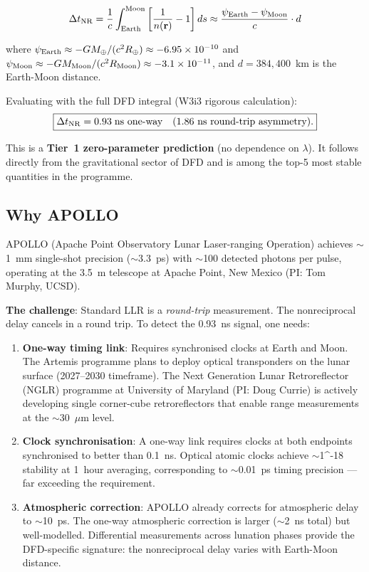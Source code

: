 \documentclass[11pt]{article}
\newcommand{\ee}[1]{\times 10^{#1}}
\begin{document}
\begin{equation}
\Delta t_{\rm NR} = \frac{1}{c}\int_{\rm Earth}^{\rm Moon}
\left[\frac{1}{n(\mathbf{r})} - 1\right] ds
\approx \frac{\psi_{\rm Earth} - \psi_{\rm Moon}}{c} \cdot d
\end{equation}

where $\psi_{\rm Earth} \approx -GM_\oplus/(c^2 R_\oplus) \approx
-6.95\ee{-10}$ and $\psi_{\rm Moon} \approx -GM_{\rm Moon}/(c^2
R_{\rm Moon}) \approx -3.1\ee{-11}$, and $d = 384{,}400$~km is
the Earth-Moon distance.

Evaluating with the full DFD integral (W3i3 rigorous calculation):
\begin{equation}
\boxed{\Delta t_{\rm NR} = 0.93 \;\text{ns one-way}
\quad \text{(1.86~ns round-trip asymmetry)}.}
\end{equation}

This is a \textbf{Tier~1 zero-parameter prediction} (no dependence
on $\lambda$). It follows directly from the gravitational sector of
DFD and is among the top-5 most stable quantities in the programme.

\subsection*{Why APOLLO}

APOLLO (Apache Point Observatory Lunar Laser-ranging Operation)
achieves $\sim$1~mm single-shot precision ($\sim$3.3~ps) with
$\sim$100 detected photons per pulse, operating at the 3.5~m
telescope at Apache Point, New Mexico (PI: Tom Murphy, UCSD).

\textbf{The challenge}: Standard LLR is a \emph{round-trip}
measurement. The nonreciprocal delay cancels in a round trip.
To detect the 0.93~ns signal, one needs:

\begin{enumerate}[nosep]
\item \textbf{One-way timing link}: Requires synchronised clocks at
  Earth and Moon. The Artemis programme plans to deploy optical
  transponders on the lunar surface (2027--2030 timeframe).
  The Next Generation Lunar Retroreflector (NGLR) programme at
  University of Maryland (PI: Doug Currie) is actively developing
  single corner-cube retroreflectors that enable range measurements
  at the $\sim$30~$\mu$m level.

\item \textbf{Clock synchronisation}: A one-way link requires clocks
  at both endpoints synchronised to better than 0.1~ns. Optical
  atomic clocks achieve $\sim$1\ee{-18} stability at 1~hour averaging,
  corresponding to $\sim$0.01~ps timing precision --- far exceeding
  the requirement.

\item \textbf{Atmospheric correction}: APOLLO already corrects for
  atmospheric delay to $\sim$10~ps. The one-way atmospheric
  correction is larger ($\sim$2~ns total) but well-modelled.
  Differential measurements across lunation phases provide the
  DFD-specific signature: the nonreciprocal delay varies with
  Earth-Moon distance.
\end{enumerate}
\end{document}
